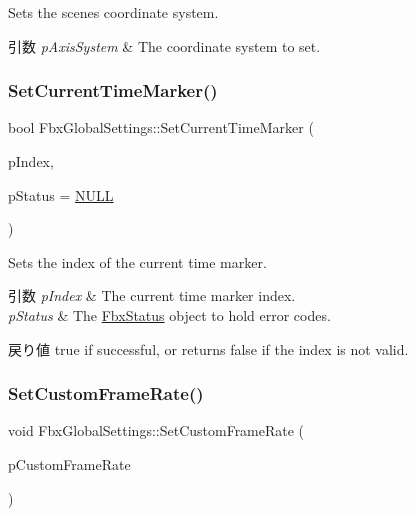 Sets the scene\textquotesingle{}s coordinate system. 
\begin{DoxyParams}{引数}
{\em p\+Axis\+System} & The coordinate system to set. \\
\hline
\end{DoxyParams}
\mbox{\label{class_fbx_global_settings_a71c9d5395cf9fbc2e328fbb62c969f77}} 
\subsubsection{\texorpdfstring{Set\+Current\+Time\+Marker()}{SetCurrentTimeMarker()}}
{\footnotesize\ttfamily bool Fbx\+Global\+Settings\+::\+Set\+Current\+Time\+Marker (\begin{DoxyParamCaption}\item[{int}]{p\+Index,  }\item[{\hyperlink{class_fbx_status}{Fbx\+Status} $\ast$}]{p\+Status = {\ttfamily \hyperlink{fbxarch_8h_a070d2ce7b6bb7e5c05602aa8c308d0c4}{N\+U\+LL}} }\end{DoxyParamCaption})}

Sets the index of the current time marker. 
\begin{DoxyParams}{引数}
{\em p\+Index} & The current time marker index. \\
\hline
{\em p\+Status} & The \hyperlink{class_fbx_status}{Fbx\+Status} object to hold error codes. \\
\hline
\end{DoxyParams}
\begin{DoxyReturn}{戻り値}
{\ttfamily true} if successful, or returns {\ttfamily false} if the index is not valid. 
\end{DoxyReturn}
\mbox{\label{class_fbx_global_settings_a12426551edf226877e000f3ca00e93b1}} 
\subsubsection{\texorpdfstring{Set\+Custom\+Frame\+Rate()}{SetCustomFrameRate()}}
{\footnotesize\ttfamily void Fbx\+Global\+Settings\+::\+Set\+Custom\+Frame\+Rate (\begin{DoxyParamCaption}\item[{double}]{p\+Custom\+Frame\+Rate }\end{DoxyParamCaption})}

